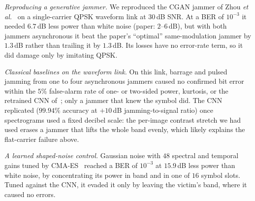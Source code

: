 \textit{Reproducing a generative jammer.}
We reproduced the CGAN jammer of Zhou \emph{et al.}~\cite{11184988} on a single-carrier QPSK waveform link at $30$\,dB SNR.
At a BER of $10^{-3}$ it needed $6.7$\,dB less power than white noise (paper: $2$--$6$\,dB), but with both jammers asynchronous it beat the paper's ``optimal'' same-modulation jammer by $1.3$\,dB rather than trailing it by $1.3$\,dB.
Its losses have no error-rate term, so it did damage only by imitating QPSK.

\textit{Classical baselines on the waveform link.}
On this link, barrage and pulsed jamming from one to four asynchronous jammers caused no confirmed bit error within the $5\%$ false-alarm rate of one- or two-sided power, kurtosis, or the retrained CNN of~\cite{9707819}; only a jammer that knew the symbol did.
The CNN replicated ($99.94\%$ accuracy at $+10$\,dB jamming-to-signal ratio) once spectrograms used a fixed decibel scale: the per-image contrast stretch we had used erases a jammer that lifts the whole band evenly, which likely explains the flat-carrier failure above.

\textit{A learned shaped-noise control.}
Gaussian noise with $48$ spectral and temporal gains tuned by CMA-ES~\cite{TODO-key} reached a BER of $10^{-3}$ at $15.9$\,dB less power than white noise, by concentrating its power in band and in one of $16$ symbol slots.
Tuned against the CNN, it evaded it only by leaving the victim's band, where it caused no errors.

